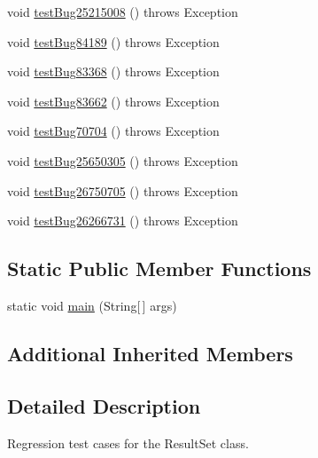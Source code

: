 \begin{DoxyCompactItemize}
\item 
void \mbox{\hyperlink{classtestsuite_1_1regression_1_1_result_set_regression_test_a907253b61a654aa59201c64918221977}{test\+Bug25215008}} ()  throws Exception 
\item 
void \mbox{\hyperlink{classtestsuite_1_1regression_1_1_result_set_regression_test_af965cfa28edc223aede9f2583526cc38}{test\+Bug84189}} ()  throws Exception 
\item 
void \mbox{\hyperlink{classtestsuite_1_1regression_1_1_result_set_regression_test_a863a946bd6da03a3bdf873749470d8ff}{test\+Bug83368}} ()  throws Exception 
\item 
void \mbox{\hyperlink{classtestsuite_1_1regression_1_1_result_set_regression_test_a75450f04071c7d70db843360e616af67}{test\+Bug83662}} ()  throws Exception 
\item 
void \mbox{\hyperlink{classtestsuite_1_1regression_1_1_result_set_regression_test_adff3e595315840e31279f6e60ea8ae4c}{test\+Bug70704}} ()  throws Exception 
\item 
void \mbox{\hyperlink{classtestsuite_1_1regression_1_1_result_set_regression_test_a0f5956c737c57829a292e224381bffb6}{test\+Bug25650305}} ()  throws Exception 
\item 
void \mbox{\hyperlink{classtestsuite_1_1regression_1_1_result_set_regression_test_ab55112fe15585a967fd38cf93a88972b}{test\+Bug26750705}} ()  throws Exception 
\item 
void \mbox{\hyperlink{classtestsuite_1_1regression_1_1_result_set_regression_test_abdf1a89f884b877e115ff10663abd11a}{test\+Bug26266731}} ()  throws Exception 
\end{DoxyCompactItemize}
\subsection*{Static Public Member Functions}
\begin{DoxyCompactItemize}
\item 
static void \mbox{\hyperlink{classtestsuite_1_1regression_1_1_result_set_regression_test_a3ccb44f60c1c13e2fc475a453f25866f}{main}} (String\mbox{[}$\,$\mbox{]} args)
\end{DoxyCompactItemize}
\subsection*{Additional Inherited Members}


\subsection{Detailed Description}
Regression test cases for the Result\+Set class. 

